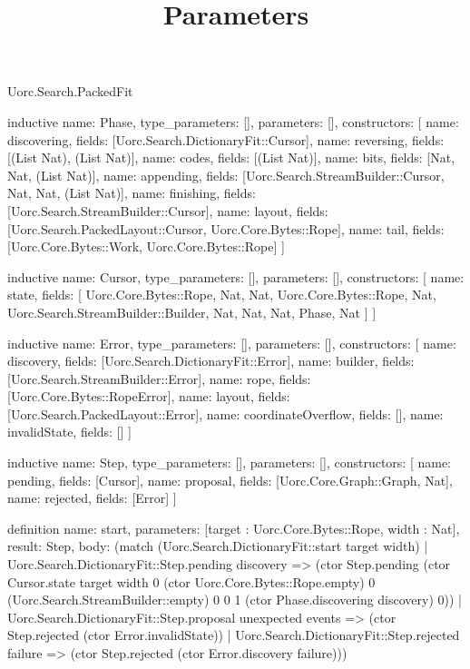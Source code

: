 \begin{lexlean}{Uorc.Search.PackedFit}
\title{Parameters}
\begin{semanticmodule}
inductive{
  name: Phase,
  type_parameters: [],
  parameters: [],
  constructors: [
    {name: discovering, fields: [Uorc.Search.DictionaryFit::Cursor]},
    {name: reversing, fields: [(List Nat), (List Nat)]},
    {name: codes, fields: [(List Nat)]},
    {name: bits, fields: [Nat, Nat, (List Nat)]},
    {name: appending, fields: [Uorc.Search.StreamBuilder::Cursor, Nat, Nat, (List Nat)]},
    {name: finishing, fields: [Uorc.Search.StreamBuilder::Cursor]},
    {name: layout, fields: [Uorc.Search.PackedLayout::Cursor, Uorc.Core.Bytes::Rope]},
    {name: tail, fields: [Uorc.Core.Bytes::Work, Uorc.Core.Bytes::Rope]}
  ]
}

inductive{
  name: Cursor,
  type_parameters: [],
  parameters: [],
  constructors: [
    {
      name: state,
      fields: [
        Uorc.Core.Bytes::Rope,
        Nat,
        Nat,
        Uorc.Core.Bytes::Rope,
        Nat,
        Uorc.Search.StreamBuilder::Builder,
        Nat,
        Nat,
        Nat,
        Phase,
        Nat
      ]
    }
  ]
}

inductive{
  name: Error,
  type_parameters: [],
  parameters: [],
  constructors: [
    {name: discovery, fields: [Uorc.Search.DictionaryFit::Error]},
    {name: builder, fields: [Uorc.Search.StreamBuilder::Error]},
    {name: rope, fields: [Uorc.Core.Bytes::RopeError]},
    {name: layout, fields: [Uorc.Search.PackedLayout::Error]},
    {name: coordinateOverflow, fields: []},
    {name: invalidState, fields: []}
  ]
}

inductive{
  name: Step,
  type_parameters: [],
  parameters: [],
  constructors: [
    {name: pending, fields: [Cursor]},
    {name: proposal, fields: [Uorc.Core.Graph::Graph, Nat]},
    {name: rejected, fields: [Error]}
  ]
}

definition{
  name: start,
  parameters: [target : Uorc.Core.Bytes::Rope, width : Nat],
  result: Step,
  body: (match (Uorc.Search.DictionaryFit::start target width)
    | Uorc.Search.DictionaryFit::Step.pending discovery => (ctor Step.pending (ctor Cursor.state target width 0 (ctor Uorc.Core.Bytes::Rope.empty) 0 (Uorc.Search.StreamBuilder::empty) 0 0 1 (ctor Phase.discovering discovery) 0))
    | Uorc.Search.DictionaryFit::Step.proposal unexpected events => (ctor Step.rejected (ctor Error.invalidState))
    | Uorc.Search.DictionaryFit::Step.rejected failure => (ctor Step.rejected (ctor Error.discovery failure)))
}


\end{semanticmodule}
\end{lexlean}
